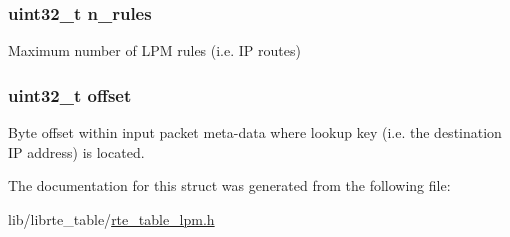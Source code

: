 \subsubsection[{n\+\_\+rules}]{\setlength{\rightskip}{0pt plus 5cm}uint32\+\_\+t n\+\_\+rules}\label{structrte__table__lpm__params_a36f832c0360005ce685ffab87c3e188a}
Maximum number of L\+P\+M rules (i.\+e. I\+P routes) \hypertarget{structrte__table__lpm__params_a894bdfa2d603d8343f8ef01dda6fcd23}{}
\subsubsection[{offset}]{\setlength{\rightskip}{0pt plus 5cm}uint32\+\_\+t offset}\label{structrte__table__lpm__params_a894bdfa2d603d8343f8ef01dda6fcd23}
Byte offset within input packet meta-\/data where lookup key (i.\+e. the destination I\+P address) is located. 

The documentation for this struct was generated from the following file\+:\begin{DoxyCompactItemize}
\item 
lib/librte\+\_\+table/\hyperlink{rte__table__lpm_8h}{rte\+\_\+table\+\_\+lpm.\+h}\end{DoxyCompactItemize}
